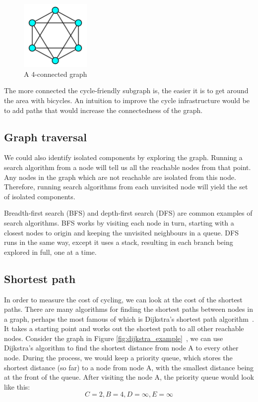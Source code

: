\documentclass[12pt,a4paper]{report}
\begin{document}
\begin{figure}[ht]
\centering
\includegraphics[width=0.3\textwidth]{plan_images/connectivity.png}
\caption{A 4-connected graph\protect\footnotemark}
\label{fig:connectivity4}
\end{figure}


The more connected the cycle-friendly subgraph is, the easier it is to get around the area with bicycles. An intuition to improve the cycle infrastructure would be to add paths that would increase the connectedness of the graph.

\subsection*{Graph traversal}
We could also identify isolated components by exploring the graph. Running a search algorithm from a node will tell us all the reachable nodes from that point. Any nodes in the graph which are not reachable are isolated from this node. Therefore, running search algorithms from each unvisited node will yield the set of isolated components. 

Breadth-first search (BFS) and depth-first search (DFS) are common examples of search algorithms. BFS works by visiting each node in turn, starting with a closest nodes to origin and keeping the unvisited neighbours in a queue. DFS runs in the same way, except it uses a stack, resulting in each branch being explored in full, one at a time. 

\subsection*{Shortest path}
In order to measure the cost of cycling, we can look at the cost of the shortest paths. There are many algorithms for finding the shortest paths between nodes in a graph, perhaps the most famous of which is Dijkstra's shortest path algorithm~\cite{dijkstra1959note}. It takes a starting point and works out the shortest path to all other reachable nodes. Consider the graph in Figure \ref{fig:dijkstra_example}~\cite{abba2022}, we can use Dijkstra's algorithm to find the shortest distance from node A to every other node. During the process, we would keep a priority queue, which stores the shortest distance (so far) to a node from node A, with the smallest distance being at the front of the queue. After visiting the node A, the priority queue would look like this:
\[C=2, B=4, D=\infty, E=\infty\]
\end{document}
